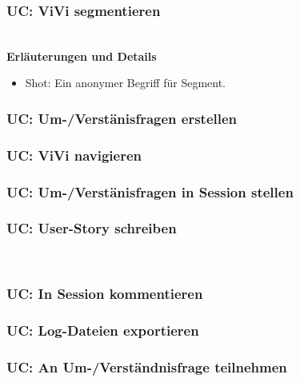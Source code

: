\subsubsection{UC: ViVi segmentieren}

\\[0.5cm]
\textbf{Erläuterungen und Details}
\begin{itemize}
	\item Shot: Ein anonymer Begriff für Segment.
\end{itemize}
\pagebreak

\subsubsection{UC: Um-/Verstänisfragen erstellen}

\pagebreak

\subsubsection{UC: ViVi navigieren}

\pagebreak

\subsubsection{UC: Um-/Verstänisfragen in Session stellen}

\pagebreak

\subsubsection{UC: User-Story schreiben}

\\[0.5cm]
\pagebreak

\subsubsection{UC: In Session kommentieren}

\pagebreak

\subsubsection{UC: Log-Dateien exportieren}

\pagebreak

\subsubsection{UC: An Um-/Verständnisfrage teilnehmen}

\pagebreak
